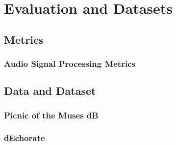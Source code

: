 \chapter{Evaluation and Datasets}\label{chap:evaluation}

\section{Metrics}
\subsection{Audio Signal Processing Metrics}

\section{Data and Dataset}
\subsection{Picnic of the Muses dB}
\subsection{dEchorate}



